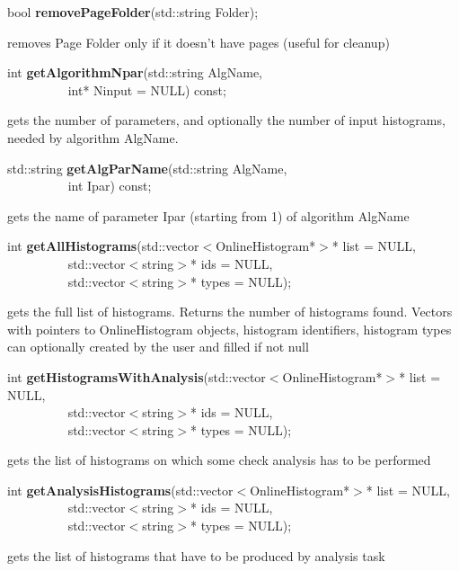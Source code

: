 \item    bool {\bf removePageFolder}(std::string Folder);


 removes Page Folder only if it doesn't have pages (useful for cleanup)


\item    int {\bf getAlgorithmNpar}(std::string AlgName,\\\mbox{}~~~~~~~~~
		       int* Ninput = NULL) const;

 gets the number of parameters, and optionally the number of input histograms, needed by algorithm AlgName.


\item    std::string {\bf getAlgParName}(std::string AlgName,\\\mbox{}~~~~~~~~~
		       int Ipar) const;

 gets the name of parameter Ipar (starting from 1) of algorithm AlgName


\item    int {\bf getAllHistograms}(std::vector$<$OnlineHistogram*$>$* list = NULL,\\\mbox{}~~~~~~~~~
		       std::vector$<$string$>$* ids = NULL,\\\mbox{}~~~~~~~~~
		       std::vector$<$string$>$* types = NULL);

 gets the full list of histograms. Returns the number of histograms found. Vectors with pointers
 to OnlineHistogram objects, histogram identifiers, histogram types can optionally created  by the user
 and filled if not null


\item    int {\bf getHistogramsWithAnalysis}(std::vector$<$OnlineHistogram*$>$* list = NULL,\\\mbox{}~~~~~~~~~
				std::vector$<$string$>$* ids = NULL,\\\mbox{}~~~~~~~~~
				std::vector$<$string$>$* types = NULL);

 gets the list of histograms on which some check analysis has to be performed 


\item    int {\bf getAnalysisHistograms}(std::vector$<$OnlineHistogram*$>$* list = NULL,\\\mbox{}~~~~~~~~~
			    std::vector$<$string$>$* ids = NULL,\\\mbox{}~~~~~~~~~
			    std::vector$<$string$>$* types = NULL);

 gets the list of histograms that have to be produced by analysis task


